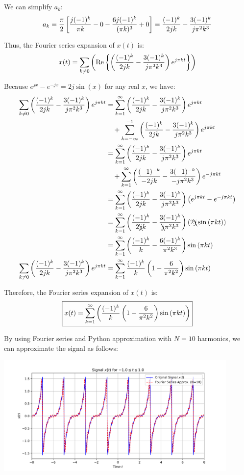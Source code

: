 \documentclass[a4paper, 10pt]{article}
\begin{document}
\begin{solution}
We can simplify \( a_k \):
\[ a_k = \frac{\pi}{2} \left[ \frac{j (-1)^{k}}{\pi k} - 0 - \frac{6 j (-1)^{k}}{(\pi k)^3} + 0 \right] = \frac{(-1)^{k}}{2jk} - \frac{3 (-1)^{k}}{j \pi^2 k^3} \]

Thus, the Fourier series expansion of \( x(t) \) is:
\[ x(t) = \sum_{k \neq 0} \left( \text{Re} \left\{ \left( \frac{(-1)^{k}}{2jk} - \frac{3 (-1)^{k}}{j \pi^2 k^3} \right) e^{j \pi k t} \right\} \right) \]

\newpage

Because \( e^{jx} - e^{-jx} = 2j\sin{(x)} \) for any real \( x \), we have:
\begin{align*}
    \sum_{k \neq 0} \left( \frac{(-1)^{k}}{2jk} - \frac{3 (-1)^{k}}{j \pi^2 k^3} \right) e^{j \pi k t} &= \sum_{k=1}^{\infty} \left( \frac{(-1)^{k}}{2jk} - \frac{3 (-1)^{k}}{j \pi^2 k^3} \right) e^{j \pi k t} \\
    &\quad + \sum_{k=-\infty}^{-1} \left( \frac{(-1)^{k}}{2jk} - \frac{3 (-1)^{k}}{j \pi^2 k^3} \right) e^{j \pi k t} \\
    &= \sum_{k=1}^{\infty} \left( \frac{(-1)^{k}}{2jk} - \frac{3 (-1)^{k}}{j \pi^2 k^3} \right) e^{j \pi k t} \\
    &\quad + \sum_{k=1}^{\infty} \left( \frac{(-1)^{-k}}{-2jk} - \frac{3 (-1)^{-k}}{-j \pi^2 k^3} \right) e^{-j \pi k t} \\
    &= \sum_{k=1}^{\infty} \left( \frac{(-1)^{k}}{2jk} - \frac{3 (-1)^{k}}{j \pi^2 k^3} \right) \left( e^{j \pi k t} - e^{-j \pi k t} \right) \\
    &= \sum_{k=1}^{\infty} \left( \frac{(-1)^{k}}{2 \bcancel{j} k} - \frac{3 (-1)^{k}}{\bcancel{j} \pi^2 k^3} \right) \left( 2 \bcancel{j} \sin{(\pi k t)} \right) \\
    &= \sum_{k=1}^{\infty} \left( \frac{(-1)^{k}}{k} - \frac{6 (-1)^{k}}{\pi^2 k^3} \right) \sin{(\pi k t)} \\
    \sum_{k \neq 0} \left( \frac{(-1)^{k}}{2jk} - \frac{3 (-1)^{k}}{j \pi^2 k^3} \right) e^{j \pi k t} &= \sum_{k=1}^{\infty} \frac{(-1)^k}{k} \left( 1 - \frac{6}{\pi^2 k^2} \right) \sin{(\pi k t)}
\end{align*}

Therefore, the Fourier series expansion of \( x(t) \) is:
\[ \boxed{ x(t) = \sum_{k=1}^{\infty} \left( \frac{(-1)^k}{k} \left( 1 - \frac{6}{\pi^2 k^2} \right) \sin{(\pi k t)} \right) } \]

By using Fourier series and Python approximation with \( N = 10 \) harmonics, we can approximate the signal as follows:
\begin{center}
    \includegraphics[width=0.9\textwidth]{images/problem_2_1.png}
\end{center}
\end{solution}
\end{document}
